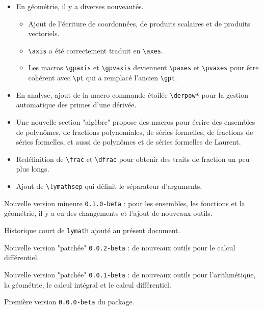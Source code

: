 \documentclass[12pt,a4paper]{article}
\begin{document}
\begin{description}[leftmargin=1em]
\begin{itemize}
        \item En géométrie, il y a diverses nouveautés.
        \begin{itemize}
            \item Ajout de l'écriture de coordonnées, de produits scalaires et de produits vectoriels.

            \item \verb+\axis+ a été correctement traduit en \verb+\axes+.

            \item Les macros \verb+\gpaxis+ et \verb+\gpvaxis+ deviennent \verb+\paxes+ et \verb+\pvaxes+ pour être cohérent avec \verb+\pt+ qui a remplacé l'ancien \verb+\gpt+.
        \end{itemize}

        \item En analyse, ajout de la macro commande étoilée \verb+\derpow*+ pour la gestion automatique des primes d'une dérivée.

        \item Une nouvelle section "algèbre" propose des macros pour écrire des ensembles de polynômes, de fractions polynomiales, de séries formelles, de fractions de séries formelles, et aussi de polynômes et de séries formelles de Laurent.

        \item Redéfinition de \verb+\frac+ et \verb+\dfrac+ pour obtenir des traits de fraction un peu plus longs.

        \item Ajout de \verb+\lymathsep+ qui définit le séparateur d'arguments.
    \end{itemize}


    \item[2017-11-01] Nouvelle version mineure \verb+0.1.0-beta+ : pour les ensembles, les fonctions et la géométrie, il y a eu des changements et l'ajout de nouveaux outils.


    \item[2017-10-21] Historique court de \verb+lymath+ ajouté au présent document.


    \item[2017-10-18] Nouvelle version "patchée" \verb+0.0.2-beta+ : de nouveaux outils pour le calcul différentiel.


    \item[2017-10-06] Nouvelle version "patchée" \verb+0.0.1-beta+ : de nouveaux outils pour l'arithmétique, la géométrie, le calcul intégral et le calcul différentiel.


    \item[2017-10-02] Première version \verb+0.0.0-beta+ du package.
\end{description}
\end{document}
